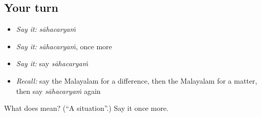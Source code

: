 \subsection*{Your turn}
\begin{itemize}
\raggedright
  \item \emph{Say it:} \emph{sāhacaryaṁ}
  \item \emph{Say it:} \emph{sāhacaryaṁ}, once more
  \item \emph{Say it:} say \emph{sāhacaryaṁ}
  \item \emph{Recall:} say the Malayalam for a difference, then the Malayalam for a matter, then say \emph{sāhacaryaṁ} again
\end{itemize}

\begin{tcolorbox}[breakable,colback=teal!4,colframe=teal!35!black,title={Before you move on}]
What does  mean? (\textquotedblleft{}A situation\textquotedblright{}.) Say it once more.
\end{tcolorbox}

